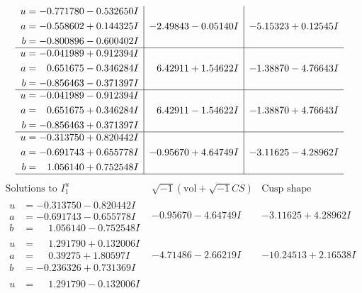 \documentclass[1p]{elsarticle_modified}
\theoremstyle{definition}
\newcommand{\I}{\sqrt{-1}}
\begin{document}
$$\begin{array}{c|c|c}
\begin{aligned}
u &= -0.771780 - 0.532650 I \\
a &= -0.558602 + 0.144325 I \\
b &= -0.800896 - 0.600402 I\end{aligned}
 & -2.49843 - 0.05140 I & -5.15323 + 0.12545 I \\ \hline\begin{aligned}
u &= -0.041989 + 0.912394 I \\
a &= \phantom{-}0.651675 - 0.346284 I \\
b &= -0.856463 - 0.371397 I\end{aligned}
 & \phantom{-}6.42911 + 1.54622 I & -1.38870 - 4.76643 I \\ \hline\begin{aligned}
u &= -0.041989 - 0.912394 I \\
a &= \phantom{-}0.651675 + 0.346284 I \\
b &= -0.856463 + 0.371397 I\end{aligned}
 & \phantom{-}6.42911 - 1.54622 I & -1.38870 + 4.76643 I \\ \hline\begin{aligned}
u &= -0.313750 + 0.820442 I \\
a &= -0.691743 + 0.655778 I \\
b &= \phantom{-}1.056140 + 0.752548 I\end{aligned}
 & -0.95670 + 4.64749 I & -3.11625 - 4.28962 I\\
 \hline 
 \end{array}$$\newpage$$\begin{array}{c|c|c}  
\text{Solutions to }I^u_{1}& \I (\text{vol} + \sqrt{-1}CS) & \text{Cusp shape}\\
 \hline 
\begin{aligned}
u &= -0.313750 - 0.820442 I \\
a &= -0.691743 - 0.655778 I \\
b &= \phantom{-}1.056140 - 0.752548 I\end{aligned}
 & -0.95670 - 4.64749 I & -3.11625 + 4.28962 I \\ \hline\begin{aligned}
u &= \phantom{-}1.291790 + 0.132006 I \\
a &= \phantom{-}0.39275 + 1.80597 I \\
b &= -0.236326 + 0.731369 I\end{aligned}
 & -4.71486 - 2.66219 I & -10.24513 + 2.16538 I \\ \hline\begin{aligned}
u &= \phantom{-}1.291790 - 0.132006 I \\

\end{aligned}
\end{array}$$
\end{document}
